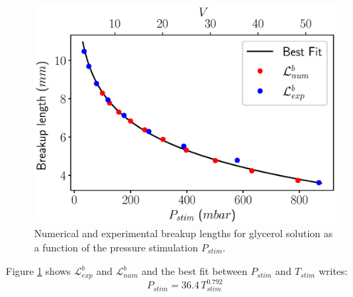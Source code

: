\documentclass[onecolumn, 12pt]{asme2ej}
\begin{document}
\begin{figure}[h]
    \centering
    \includegraphics[width=15cm]{Figures/Fig9.eps}
    \caption{Numerical and experimental breakup lengths for glycerol solution as a function of the pressure stimulation $P_{stim}$.}
    \label{fig:LbGlycerol}
\end{figure}


Figure \ref{fig:LbGlycerol} shows $\mathcal{L}_{exp}^b$ and $\mathcal{L}_{num}^b$ and the best fit between $P_{stim}$ and $T_{stim}$ writes:
\begin{equation}
    P_{stim} = 36.4 \, T_{stim}^{0.792}
\end{equation}
\end{document}

